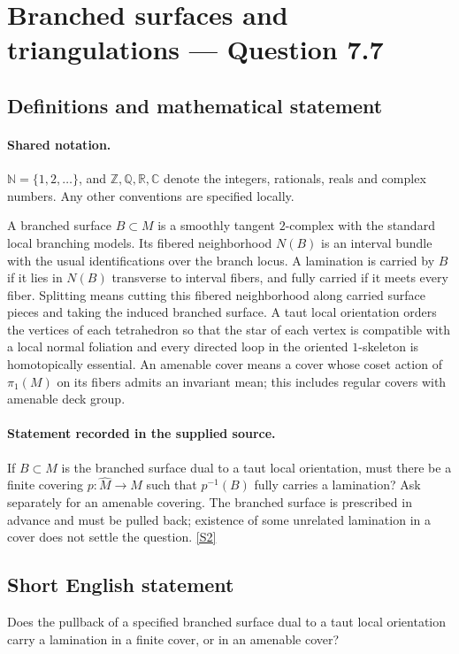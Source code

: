 \documentclass[11pt]{article}
\newcommand{\sref}[2]{\hyperlink{source:#1:#2}{[S#2]}}
\begin{document}
\section{Branched surfaces and triangulations — Question 7.7}\label{statement}

\subsection{Definitions and mathematical statement}

\paragraph{Shared notation.}$\mathbb N=\{1,2,\ldots\}$, and $\mathbb Z,\mathbb Q,\mathbb R,\mathbb C$ denote the integers, rationals, reals and complex numbers. Any other conventions are specified locally.


A branched surface $B\subset M$ is a smoothly tangent $2$-complex with the standard local branching models. Its fibered neighborhood $N(B)$ is an interval bundle with the usual identifications over the branch locus. A lamination is carried by $B$ if it lies in $N(B)$ transverse to interval fibers, and fully carried if it meets every fiber. Splitting means cutting this fibered neighborhood along carried surface pieces and taking the induced branched surface. A taut local orientation orders the vertices of each tetrahedron so that the star of each vertex is compatible with a local normal foliation and every directed loop in the oriented $1$-skeleton is homotopically essential. An amenable cover means a cover whose coset action of $\pi_1(M)$ on its fibers admits an invariant mean; this includes regular covers with amenable deck group.
\paragraph{Statement recorded in the supplied source.}
If $B\subset M$ is the branched surface dual to a taut local orientation, must there be a finite covering $p:\widehat M\to M$ such that $p^{-1}(B)$ fully carries a lamination? Ask separately for an amenable covering. The branched surface is prescribed in advance and must be pulled back; existence of some unrelated lamination in a cover does not settle the question. \sref{statement}{2}
\subsection{Short English statement}
Does the pullback of a specified branched surface dual to a taut local orientation carry a lamination in a finite cover, or in an amenable cover?
\end{document}
